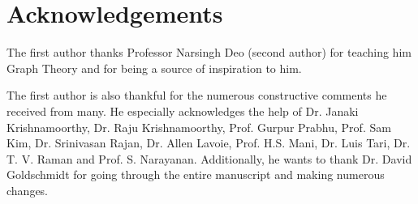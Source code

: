 \chapter*{Acknowledgements}
The first author thanks Professor Narsingh Deo (second author) for teaching him Graph Theory and for being a source of inspiration to him.

The first author is also thankful for the numerous constructive comments he received from many. He especially acknowledges the help of Dr. Janaki Krishnamoorthy, Dr. Raju Krishnamoorthy, Prof. Gurpur Prabhu, Prof. Sam Kim, Dr. Srinivasan Rajan, Dr. Allen Lavoie, Prof. H.S. Mani, Dr. Luis Tari, Dr. T. V. Raman and Prof. S. Narayanan. Additionally, he wants to thank Dr. David Goldschmidt for going through the entire manuscript and making numerous changes.


